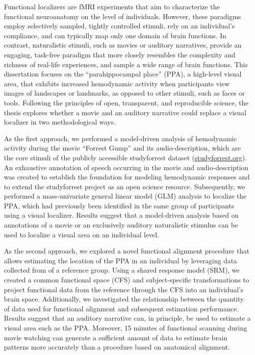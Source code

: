 
Functional localizers are fMRI experiments that aim to characterize the
functional neuroanatomy on the level of individuals.
%
However, these paradigms employ selectively sampled, tightly controlled
stimuli, rely on an individual's compliance, and can typically map only one
domain of brain functions.
In contrast, naturalistic stimuli, such as movies or auditory narratives,
provide an engaging, task-free paradigm that more closely resembles the
complexity and richness of real-life experiences, and sample a wide range of
brain functions.
This dissertation focuses on the ``parahippocampal place'' (PPA), a high-level
visual area, that exhibits increased hemodynamic activity when participants view
images of landscapes or landmarks, as opposed to other stimuli, such as faces
or tools.
Following the principles of open, transparent, and reproducible science, the
thesis explores whether a movie and an auditory narrative could replace a
visual localizer in two methodological ways.

As the first approach, we performed a model-driven analysis of hemodynamic
activity during the movie ``Forrest Gump'' and its audio-description, which are
the core stimuli of the publicly accessible studyforrest dataset
(\href{www.studyforrest.org}{\url{studyforrest.org}}).
%
An exhaustive annotation of speech occurring in the movie and audio-description
was created to establish the foundation for modeling hemodynamic responses and
to extend the studyforrest project as an open science resource.
Subsequently, we performed a mass-univariate general linear model (GLM)
analysis to localize the PPA, which had previously been identified in the same
group of participants using a visual localizer.
Results suggest that a model-driven analysis based on annotations of a movie or
an exclusively auditory naturalistic stimulus can be used to localize a visual
area on an individual level.

As the second approach, we explored a novel functional alignment procedure that
allows estimating the location of the PPA in an individual by leveraging data
collected from of a reference group.
%
Using a shared response model (SRM), we created a common functional space (CFS)
and subject-specific transformations to project functional data from the
reference through the CFS into an individual's brain space.
%
Additionally, we investigated the relationship between the quantity of data
used for functional alignment and subsequent estimation performance.
%
Results suggest that an auditory narrative can, in principle, be used to
estimate a visual area such as the PPA.
%
Moreover, 15 minutes of functional scanning during movie watching can generate
a sufficient amount of data to estimate brain patterns more accurately than a
procedure based on anatomical alignment.

